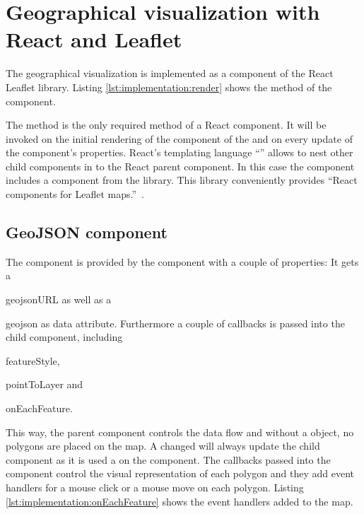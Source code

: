 \section{Geographical visualization with React and Leaflet}

The geographical visualization is implemented as a  component of the React Leaflet library.
Listing \ref{lst:implementation:render} shows the  method of the component.



The  method is the only required method of a React component.
It will be invoked on the initial rendering of the component of the  and on every update of the component's properties.
React's templating language ``'' allows to nest other child components in to the React parent component.
In this case the  component includes a   component from the  library.
This library conveniently provides ``React components for Leaflet maps.''~\cite{ReactLeaflet2017}.

\subsection{GeoJSON component}

The  component is provided by the  component with a couple of properties:
It gets a
\begin{enumerate*}[label=(\arabic*)]
  \item
    geojsonURL as well as a
  \item
    geojson as data attribute. Furthermore a couple of callbacks is passed into the child component, including
  \item
    featureStyle,
  \item
    pointToLayer and
  \item
    onEachFeature.
\end{enumerate*}

This way, the parent  component controls the data flow and without a  object, no polygons are placed on the map.
A changed  will always update the child component as it is used a  on the  component.
The callbacks passed into the  component control the visual representation of each polygon and they add event handlers for a mouse click or a mouse move on each polygon.
Listing \ref{lst:implementation:onEachFeature} shows the event handlers added to the map.

